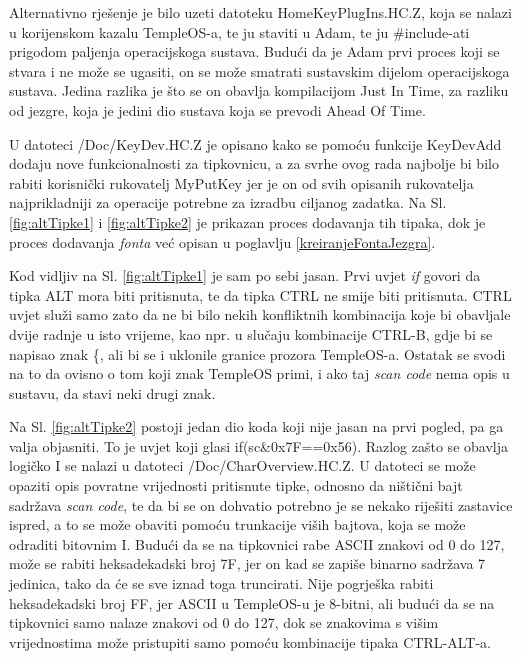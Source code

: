 \documentclass{foi}
\begin{document}
Alternativno rješenje je bilo uzeti datoteku {\selectfont HomeKeyPlugIns.HC.Z}, koja se nalazi u korijenskom kazalu TempleOS-a, te ju staviti u Adam, te ju {\selectfont \#include}-ati prigodom paljenja operacijskoga sustava. Budući da je Adam prvi proces koji se stvara i ne može se ugasiti, on se može smatrati sustavskim dijelom operacijskoga sustava. Jedina razlika je što se on obavlja kompilacijom Just In Time, za razliku od jezgre, koja je jedini dio sustava koja se prevodi Ahead Of Time.

U datoteci {\selectfont /Doc/KeyDev.HC.Z} je opisano kako se pomoću funkcije {\selectfont KeyDevAdd} dodaju nove funkcionalnosti za tipkovnicu, a za svrhe ovog rada najbolje bi bilo rabiti korisnički rukovatelj {\selectfont MyPutKey} jer je on od svih opisanih rukovatelja najprikladniji za operacije potrebne za izradbu ciljanog zadatka. Na Sl. \ref{fig:altTipke1} i \ref{fig:altTipke2} je prikazan proces dodavanja tih tipaka, dok je proces dodavanja \emph{fonta} već opisan u poglavlju \ref{kreiranjeFontaJezgra}.

Kod vidljiv na Sl. \ref{fig:altTipke1} je sam po sebi jasan. Prvi uvjet \emph{if} govori da tipka {\selectfont ALT} mora biti pritisnuta, te da tipka {\selectfont CTRL} ne smije biti pritisnuta. {\selectfont CTRL} uvjet služi samo zato da ne bi bilo nekih konfliktnih kombinacija koje bi obavljale dvije radnje u isto vrijeme, kao npr. u slučaju kombinacije {\selectfont CTRL-B}, gdje bi se napisao znak {\selectfont \{}, ali bi se i uklonile granice prozora TempleOS-a. Ostatak se svodi na to da ovisno o tom koji znak TempleOS primi, i ako taj \emph{scan code} nema opis u sustavu, da stavi neki drugi znak.

Na Sl. \ref{fig:altTipke2} postoji jedan dio koda koji nije jasan na prvi pogled, pa ga valja objasniti. To je uvjet koji glasi {\selectfont if(sc\&0x7F==0x56)}. Razlog zašto se obavlja logičko I se nalazi u datoteci {\selectfont /Doc/CharOverview.HC.Z}. U datoteci se može opaziti opis povratne vrijednosti pritisnute tipke, odnosno da ništični bajt sadržava \emph{scan code}, te da bi se on dohvatio potrebno je se nekako riješiti zastavice ispred, a to se može obaviti pomoću trunkacije viših bajtova, koja se može odraditi bitovnim I. Budući da se na tipkovnici rabe ASCII znakovi od 0 do 127, može se rabiti heksadekadski broj {\selectfont 7F}, jer on kad se zapiše binarno sadržava 7 jedinica, tako da će se sve iznad toga truncirati. Nije pogrješka rabiti heksadekadski broj {\selectfont FF}, jer ASCII u TempleOS-u je 8-bitni, ali budući da se na tipkovnici samo nalaze znakovi od 0 do 127, dok se znakovima s višim vrijednostima može pristupiti samo pomoću kombinacije tipaka {\selectfont CTRL-ALT-a}.
\end{document}
